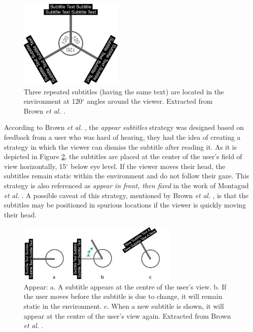 \begin{figure}[!ht]
    \centering
    \includegraphics[width=0.45\textwidth]{img/video360/120_subtitles.png}
    \caption{Three repeated subtitles (having the same text) are located in the environment at 120$^{\circ}$ angles around the viewer. Extracted from Brown \emph{et al.} \cite{brown_subtitles_2017}.}
    \label{fig:120_subtitles}
\end{figure}

According to Brown \emph{et al.} \cite{brown_subtitles_2017}, the \emph{appear subtitles} strategy was designed based on feedback from a user who was hard of hearing, they had the idea of creating a strategy in which the viewer can dismiss the subtitle after reading it. As it is depicted in Figure \ref{fig:appear_subtitle}, the subtitles are placed at the center of the user's field of view horizontally, 15$^{\circ}$ below eye level. If the viewer moves their head, the subtitles remain static within the environment and do not follow their gaze. This strategy is also referenced as \emph{appear in front, then fixed} in the work of Montagud \emph{et al.} \cite{montagud_culture_2020}. A possible caveat of this strategy, mentioned by Brown \emph{et al.} \cite{brown_subtitles_2017}, is that the subtitles may be positioned in spurious locations if the viewer is quickly moving their head.


\begin{figure}[!ht]
    \centering
    \includegraphics[width=0.7\textwidth]{img/video360/appear.png}
    \caption{Appear: a. A subtitle appears at the centre of the user's view. b. If the user moves before the subtitle is due to change, it will remain static in the environment. c. When a new subtitle is shown, it will appear at the centre of the user's view again. Extracted from Brown \emph{et al.} \cite{brown_subtitles_2017}.}
    \label{fig:appear_subtitle}
\end{figure}

